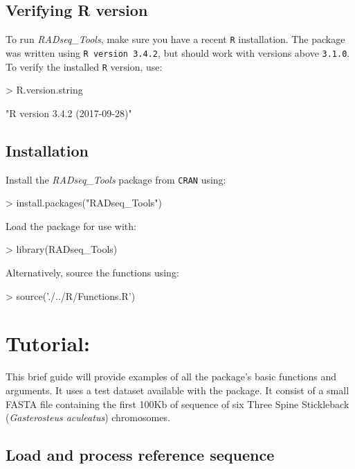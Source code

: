 \documentclass{article}
\begin{document}
\subsection*{Verifying R version}
To run \emph{RADseq\_Tools}, make sure you have a recent \texttt{R} installation. The package was written using \texttt{R version 3.4.2}, but should work with versions above \texttt{3.1.0}. To verify the installed \texttt{R} version, use:
\begin{Schunk}
\begin{Sinput}
> R.version.string
\end{Sinput}
\begin{Soutput}
[1] "R version 3.4.2 (2017-09-28)"
\end{Soutput}
\end{Schunk}

\subsection*{Installation}
Install the \emph{RADseq\_Tools} package from \texttt{CRAN} using:

\begin{Schunk}
\begin{Sinput}
> install.packages("RADseq_Tools")
\end{Sinput}
\end{Schunk}

Load the package for use with:
\begin{Schunk}
\begin{Sinput}
> library(RADseq_Tools)
\end{Sinput}
\end{Schunk}
Alternatively, source the functions using:
\begin{Schunk}
\begin{Sinput}
> source('./../R/Functions.R')
\end{Sinput}
\end{Schunk}

\section*{Tutorial:}

This brief guide will provide examples of all the package's basic functions and arguments. It uses a test dataset available with the package. It consist of a small FASTA file containing the first 100Kb of sequence of six Three Spine Stickleback (\emph{Gasterosteus aculeatus}) chromosomes.

\subsection*{Load and process reference sequence}
\end{document}
